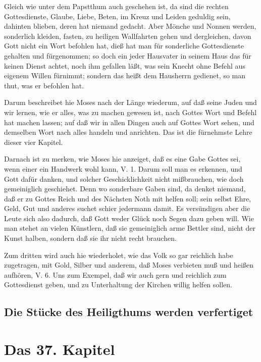 Gleich wie unter dem Papstthum auch geschehen ist, da sind die rechten Gottesdienste, Glaube, Liebe, Beten, im Kreuz und Leiden geduldig sein, dahinten blieben, deren hat niemand gedacht. Aber Mönche und Nonnen werden, sonderlich kleiden, fasten, zu heiligen Wallfahrten gehen und dergleichen, davon Gott nicht ein Wort befohlen hat, dieß hat man für sonderliche Gottesdienste gehalten und fürgenommen; so doch ein jeder Hausvater in seinem Haus das für keinen Dienst achtet, noch ihm gefallen läßt, was sein Knecht ohne Befehl aus eigenem Willen fürnimmt; sondern das heißt dem Hausherrn gedienet, so man thut, was er befohlen hat.

Darum beschreibet hie Moses nach der Länge wiederum, auf daß seine Juden und wir lernen, wie er alles, was zu machen gewesen ist, nach Gottes Wort und Befehl hat machen lassen; auf daß wir in allen Dingen auch auf Gottes Wort sehen, und demselben Wort nach alles handeln und anrichten. Das ist die fürnehmste Lehre dieser vier Kapitel.

Darnach ist zu merken, wie Moses hie anzeiget, daß es eine Gabe Gottes sei, wenn einer ein Handwerk wohl kann, V. 1. Darum soll man es erkennen, und Gott dafür danken, und solcher Geschicklichkeit nicht mißbrauchen, wie doch gemeiniglich geschiehet. Denn wo sonderbare Gaben sind, da denket niemand, daß er zu Gottes Reich und des Nächsten Noth mit helfen soll; sein selbst Ehre, Geld, Gut und anderes suchet schier jedermann damit. Es versündigen aber die Leute sich also dadurch, daß Gott weder Glück noch Segen dazu geben will. Wie man stehet an vielen Künstlern, daß sie gemeiniglich arme Bettler sind, nicht der Kunst halben, sondern daß sie ihr nicht recht brauchen.

Zum dritten wird auch hie wiederholet, wie das Volk so gar reichlich habe zugetragen, mit Gold, Silber und anderem, daß Moses verbieten muß und heißen aufhören, V. 6. Uns zum Exempel, daß wir auch gern und reichlich zum Gottesdienst geben, und zu Unterhaltung der Kirchen willig helfen sollen.

\section{Die Stücke des Heiligthums werden verfertiget}

\chapter{Das 37. Kapitel}

